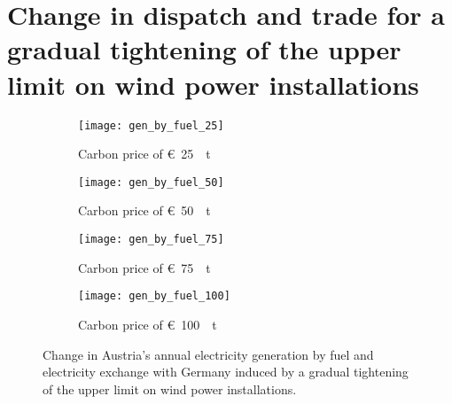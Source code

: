 \documentclass[review, 3p, times, 12pt, authoryear]{elsarticle}
\begin{document}
    \section{Change in dispatch and trade for a gradual tightening of the upper limit on wind power installations}
    \begin{figure}[h!]
        \centering
        \begin{subfigure}[b]{0.49\textwidth}
            \centering
            \texttt{[image: gen\_by\_fuel\_25]}
            \caption{Carbon price of \SI[per-mode=symbol,sticky-per, bracket-unit-denominator=false]{25}[\euro]{\per\tonne\coo}}
            \label{fig:app_dispatch_a}
        \end{subfigure}
        \hfill
        \begin{subfigure}[b]{0.49\textwidth}
            \centering
            \texttt{[image: gen\_by\_fuel\_50]}
            \caption{Carbon price of \SI[per-mode=symbol,sticky-per, bracket-unit-denominator=false]{50}[\euro]{\per\tonne\coo}}
            \label{fig:app_dispatch_b}
        \end{subfigure}
        \hfill
        \begin{subfigure}[b]{0.49\textwidth}
            \centering
            \texttt{[image: gen\_by\_fuel\_75]}
            \caption{Carbon price of \SI[per-mode=symbol,sticky-per, bracket-unit-denominator=false]{75}[\euro]{\per\tonne\coo}}
            \label{fig:app_dispatch_c}
        \end{subfigure}
        \hfill
        \begin{subfigure}[b]{0.49\textwidth}
            \centering
            \texttt{[image: gen\_by\_fuel\_100]}
            \caption{Carbon price of \SI[per-mode=symbol,sticky-per, bracket-unit-denominator=false]{100}[\euro]{\per\tonne\coo}}
            \label{fig:app_dispatch_c}
        \end{subfigure}

        \caption{Change in Austria's annual electricity generation by fuel and electricity exchange with Germany induced by a gradual tightening of the upper limit on wind power installations.}
        \label{fig:app_dispatch}
    \end{figure}
\end{document}

